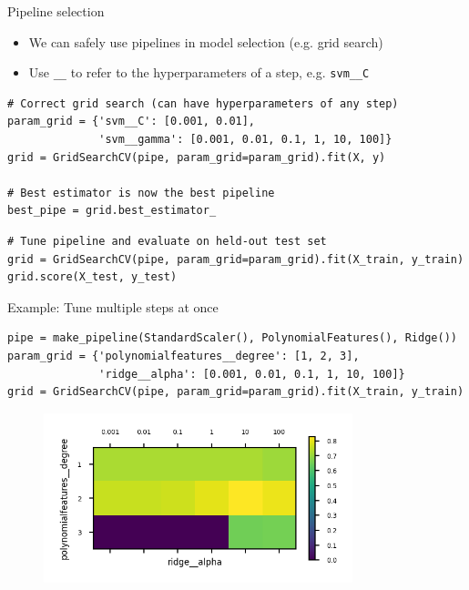 \begin{frame}[fragile]{Pipeline selection}
\begin{itemize}
    \item We can safely use pipelines in model selection (e.g. grid search)
    \item Use \texttt{\_\_} to refer to the hyperparameters of a step, e.g. \texttt{svm\_\_C}
\end{itemize}

\vspace{1em}
\scriptsize
\begin{verbatim}
# Correct grid search (can have hyperparameters of any step)
param_grid = {'svm__C': [0.001, 0.01],
              'svm__gamma': [0.001, 0.01, 0.1, 1, 10, 100]}
grid = GridSearchCV(pipe, param_grid=param_grid).fit(X, y)

# Best estimator is now the best pipeline
best_pipe = grid.best_estimator_
\end{verbatim}

\vspace{1em}
\begin{verbatim}
# Tune pipeline and evaluate on held-out test set
grid = GridSearchCV(pipe, param_grid=param_grid).fit(X_train, y_train)
grid.score(X_test, y_test)
\end{verbatim}
\normalsize
\end{frame}


\begin{frame}[fragile]{Example: Tune multiple steps at once}
\scriptsize
\begin{verbatim}
pipe = make_pipeline(StandardScaler(), PolynomialFeatures(), Ridge())
param_grid = {'polynomialfeatures__degree': [1, 2, 3],
              'ridge__alpha': [0.001, 0.01, 0.1, 1, 10, 100]}
grid = GridSearchCV(pipe, param_grid=param_grid).fit(X_train, y_train)
\end{verbatim}
\normalsize

\vspace{1em}
\begin{figure}
    \centering
    \includegraphics[width=0.8\textwidth,keepaspectratio]{images/pre-processing/pipeline_2.png}
\end{figure}
\end{frame}
